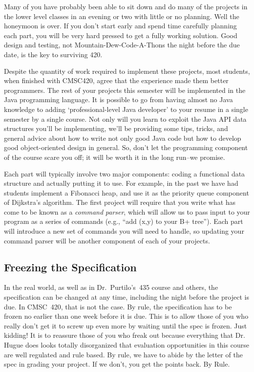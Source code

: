 \documentclass[12pt]{article}
\begin{document}
Many of you have probably been able to sit down and do many of the projects
in the lower level classes in an evening or two with little or no
planning. Well the honeymoon is over. If you don't start early and spend
time carefully planning each part, you will be very hard pressed to get a
fully working solution.  Good design and testing, not
Mountain-Dew-Code-A-Thons the night before the due date, is the key to
surviving 420. 

Despite the quantity of work required to  implement these
projects, most students, when finished with CMSC420, agree that the
experience made them better programmers.  The rest of your projects this
semester will be implemented in the Java programming language.  It is
possible to go from having almost no Java knowledge to adding
`professional-level Java developer' to your resume in a single
semester by a single course.  Not only will you learn to exploit the
Java API data structures you'll be implementing, we'll be providing
some tips, tricks, and general advice about how to write not only good
Java code but how to develop good object-oriented design in general.
So, don't let the programming component of the course scare you off;
it will be worth it in the long run--we promise.


Each part will typically involve two major components: coding a
functional data structure and actually putting it to use.  For
example, in the past we have had students implement a Fibonacci heap,
and use it as the priority queue component of Dijkstra's algorithm.
The first project will require that you write what has come to be
known as a \emph{command} \emph{parser},
 which will allow us to pass input to your
program as a series of commands (e.g., ``add (x,y) to your B+ tree'').
Each part will introduce a new set of commands you will need to
handle, so updating your command parser will be another component of
each of your projects. 

\subsection{Freezing the Specification}
In the real world, as well as in Dr.~Purtilo's~435 course and others, the
specification can be changed at any time, including the night before
the project is due. In CMSC~420, that is not the case. By rule, the
specification has to be frozen no earlier than one week before it is
due. This is to allow those of you who really don't get it to screw up
even more by waiting until the spec is frozen. Just kidding! It is to reassure
 those of you who freak out because everything that Dr. Hugue does looks totally
disorganized that evaluation opportunities in this
course are well regulated and rule based. By rule, we have to abide by
the letter of the spec in grading your project. If we don't, you get
the points back. By Rule.
\end{document}
